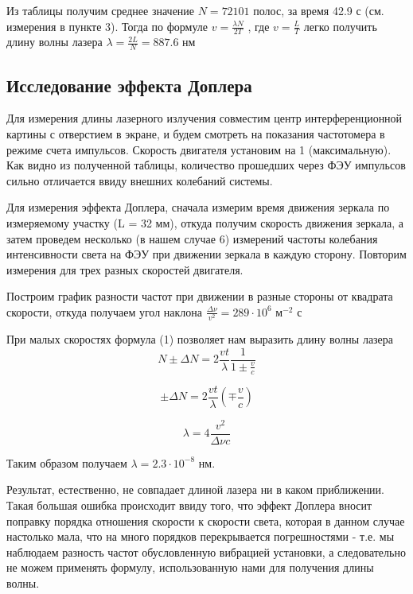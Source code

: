 \documentclass[15pt,a5paper,reqno]{article}
\begin{document}
\begin{table}[h!]
	\centering
	
	\caption{}
	\label{nu1}
\end{table}  


Из таблицы получим среднее значение $N = 72101$ полос, за время 42.9 с (см. измерения в пункте 3). Тогда по формуле $v = \frac{\lambda N}{2T}$ , где $v = \frac{L}{T}$ легко получить длину волны лазера $\lambda = \frac{2L}{N} = 887.6$ нм


\subsection{Исследование эффекта Доплера}

Для измерения длины лазерного излучения совместим центр интерференционной картины с отверстием в экране, и будем смотреть на показания частотомера в режиме счета импульсов.
Скорость двигателя установим на 1 (максимальную).
Как видно из полученной таблицы, количество прошедших через ФЭУ импульсов сильно отличается ввиду внешних колебаний системы.

Для измерения эффекта Доплера, сначала измерим время движения зеркала по измеряемому участку (L = 32 мм), откуда получим скорость движения зеркала, а затем проведем несколько (в нашем случае 6) измерений частоты колебания интенсивности света на ФЭУ при движении зеркала в каждую сторону.
Повторим измерения для трех разных скоростей двигателя.

Построим график разности частот при движении в разные стороны от квадрата скорости, откуда получаем угол наклона $\frac{\Delta \nu}{v^2} = 289 \cdot 10^{6}$ $\text{м}^{-2} $ с

При малых скоростях формула (1) позволяет нам выразить длину волны лазера
\begin{equation}
    N \pm \Delta N = 2\frac{vt}{\lambda}\frac{1}{1 \pm \frac{v}{c}}
\end{equation}

\begin{equation}
    \pm \Delta N = 2\frac{vt}{\lambda}(\mp \frac{v}{c})
\end{equation}


\begin{equation}
    \lambda = 4\frac{v^2}{\Delta \nu c}
\end{equation}

Таким образом получаем $\lambda = 2.3 \cdot 10^{-8}$ нм.

Результат, естественно, не совпадает длиной лазера ни в каком приближении. Такая большая ошибка происходит ввиду того, что эффект Доплера вносит поправку порядка отношения скорости к скорости света, которая в данном случае настолько мала, что на много порядков перекрывается погрешностями - т.е. мы наблюдаем разность частот обусловленную вибрацией установки, а следовательно не можем применять формулу, использованную нами для получения длины волны.
\end{document}
